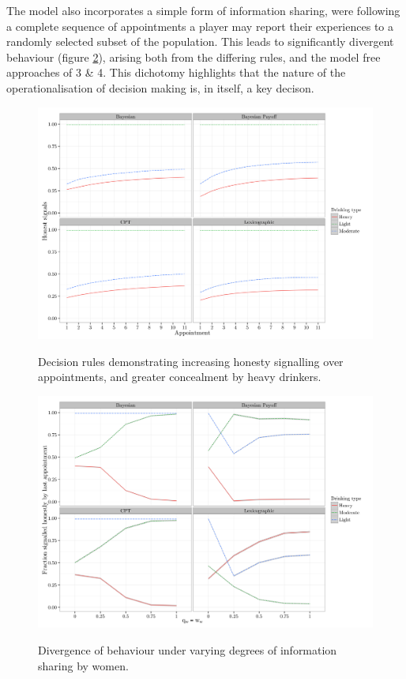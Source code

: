 \documentclass[twocolumn]{article}
\begin{document}
The model also incorporates a simple form of information sharing, were following a complete sequence of appointments a player may report their experiences to a randomly selected subset of the population. This leads to significantly divergent behaviour (figure \ref{fig_2}), arising both from the differing rules, and the model free approaches of 3 \& 4. This dichotomy highlights that the nature of the operationalisation of decision making is, in itself, a key decison.

\begin{figure}[h!]{\includegraphics[width=\columnwidth]{honesty_plot}}
	\caption{Decision rules demonstrating increasing honesty signalling over appointments, and greater concealment by heavy drinkers.\label{fig_1}}
\end{figure}

\begin{figure}[h!]{\includegraphics[width=\columnwidth]{honesty_sharing}}
	\caption{Divergence of behaviour under varying degrees of information sharing by women.\label{fig_2}}
\end{figure}


\end{document}
